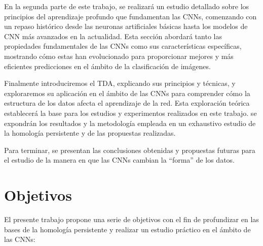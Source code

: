 En la segunda parte de este trabajo, se realizará un estudio detallado sobre los
principios del aprendizaje profundo que fundamentan las CNNs, comenzando con un repaso
histórico desde las neuronas artificiales básicas hasta los modelos de CNN más avanzados
en la actualidad. Esta sección abordará tanto las propiedades fundamentales de
las CNNs como sus características específicas, mostrando cómo estas han evolucionado
para proporcionar mejores y más eficientes predicciones en el ámbito de la clasificación
de imágenes.

Finalmente introduciremos el TDA, explicando sus principios y técnicas, y exploraremos
su aplicación en el ámbito de las CNNs para comprender cómo la estructura de los
datos afecta el aprendizaje de la red. Esta exploración teórica establecerá la
base para los estudios y experimentos realizados en este trabajo. se expondrán los
resultados y la metodología empleada en un exhaustivo estudio de la homología persistente
y de las propuestas realizadas.

Para terminar, se presentan las conclusiones obtenidas y propuestas futuras para
el estudio de la manera en que las CNNs cambian la \enquote{forma} de los datos.

\section{Objetivos}

El presente trabajo propone una serie de objetivos con el fin de profundizar en
las bases de la homología persistente y realizar un estudio práctico en el
ámbito de las CNNs:

